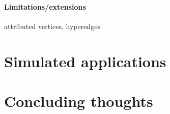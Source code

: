 % 
% 
% 
% 



\paragraph{Limitations/extensions}

attributed vertices, hyperedges

\section{Simulated applications}

\section{Concluding thoughts}






